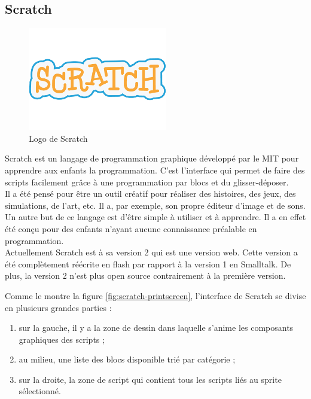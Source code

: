 \subsection{Scratch}

\begin{figure}[!ht]
  \begin{center}
    \includegraphics[scale=0.4]{content/5-related_work/images/scratch}
    \caption{Logo de Scratch}
    \label{fig:scratch}
  \end{center}
\end{figure}
Scratch \cite{scratch} est un langage de programmation graphique développé par le MIT pour apprendre aux enfants la programmation. C'est l'interface qui permet de faire des \glspl{script} facilement grâce à une programmation par \glspl{bloc} et du glisser-déposer.\\

Il a été pensé pour être un outil créatif pour réaliser des histoires, des jeux, des simulations, de l'art, etc. Il a, par exemple, son propre éditeur d'image et de sons. Un autre but de ce langage est d'être simple à utiliser et à apprendre. Il a en effet été conçu pour des enfants n'ayant aucune connaissance préalable en programmation.\\

Actuellement Scratch est à sa version 2 qui est une version web. Cette version a été complètement réécrite en flash par rapport à la version 1 en Smalltalk. De plus, la version 2 n'est plus open source contrairement à la première version.

Comme le montre la figure \ref{fig:scratch-printscreen}, l'interface de Scratch se divise en plusieurs grandes parties :

\begin{enumerate}
\item sur la gauche, il y a la zone de dessin dans laquelle s'anime les composants graphiques des \glspl{script} ;
\item au milieu, une liste des \glspl{bloc} disponible trié par catégorie ;
\item sur la droite, la zone de \gls{script} qui contient tous les \glspl{script} liés au \gls{sprite} sélectionné.
\end{enumerate}


